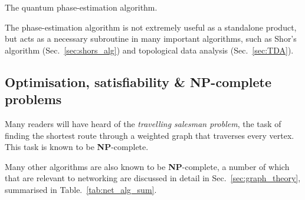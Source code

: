 \begin{table}[!htb]
\caption{The quantum phase-estimation algorithm.} \label{alg:q_phase_est}
\end{table}

The phase-estimation algorithm is not extremely useful as a standalone product, but acts as a necessary subroutine in many important algorithms, such as Shor's algorithm (Sec.~\ref{sec:shors_alg}) and topological data analysis (Sec.~\ref{sec:TDA}).

%
%

\subsection{Optimisation, satisfiability \& \textbf{NP}-complete problems}

Many readers will have heard of the \textit{travelling salesman problem}, the task of finding the shortest route through a weighted graph that traverses every vertex. This task is known to be \textbf{NP}-complete.

Many other algorithms are also known to be \textbf{NP}-complete, a number of which that are relevant to networking are discussed in detail in Sec.~\ref{sec:graph_theory}, summarised in Table.~\ref{tab:net_alg_sum}.

